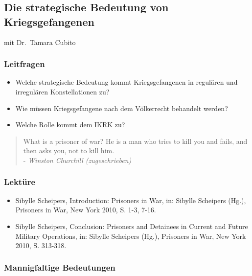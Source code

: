 {}\documentclass[a4paper]{article}
\providecommand{\tightlist}{\setlength{\itemsep}{1mm}\setlength{\parskip}{1mm}}
\begin{document}
\subsection{Die strategische Bedeutung von
	Kriegsgefangenen}\label{die-strategische-bedeutung-von-kriegsgefangenen}

mit Dr.~Tamara Cubito

\subsubsection{Leitfragen}\label{leitfragen-6}

\begin{itemize}
	\tightlist
	\item
	      Welche strategische Bedeutung kommt Kriegsgefangenen in regulären und
	      irregulären Konstellationen zu?
	\item
	      Wie müssen Kriegsgefangene nach dem Völkerrecht behandelt werden?
	\item
	      Welche Rolle kommt dem IKRK zu?
\end{itemize}

\begin{quote}
	What is a prisoner of war? He is a man who tries to kill you and fails,
	and then asks you, not to kill him.\\
	- \emph{Winston Churchill (zugeschrieben)}
\end{quote}

\subsubsection{Lektüre}\label{lektuxfcre-6}

\begin{itemize}
	\tightlist
	\item
	      Sibylle Scheipers, Introduction: Prisoners in War, in: Sibylle
	      Scheipers (Hg.), Prisoners in War, New York 2010, S. 1-3, 7-16.
	\item
	      Sibylle Scheipers, Conclusion: Prisoners and Detainees in Current and
	      Future Military Operations, in: Sibylle Scheipers (Hg.), Prisoners in
	      War, New York 2010, S. 313-318.
\end{itemize}

\subsubsection{Mannigfaltige
	Bedeutungen}\label{mannigfaltige-bedeutungen}
\end{document}
